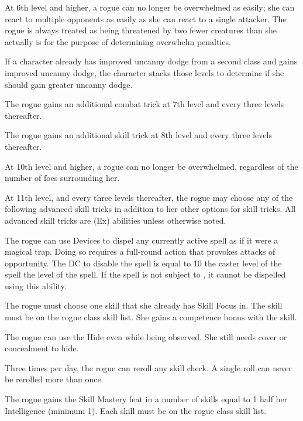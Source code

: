  At 6th level and higher, a rogue can no longer be overwhelmed as easily; she can react to multiple opponents as easily as she can react to a single attacker. The rogue is always treated as being threatened by two fewer creatures than she actually is for the purpose of determining overwhelm penalties. 

\par If a character already has improved uncanny dodge from a second class and gains improved uncanny dodge, the character stacks those levels to determine if she should gain greater uncanny dodge.

 The rogue gains an additional combat trick at 7th level and every three levels thereafter.

 The rogue gains an additional skill trick at 8th level and every three levels thereafter.

 At 10th level and higher, a rogue can no longer be overwhelmed, regardless of the number of foes surrounding her.

 At 11th level, and every three levels thereafter, the rogue may choose any of the following advanced skill tricks in addition to her other options for skill tricks. All advanced skill tricks are (Ex) abilities unless otherwise noted.

 The rogue can use Devices to dispel any currently active spell as if it were a magical trap. Doing so requires a full-round action that provokes attacks of opportunity. The DC to disable the spell is equal to 10 \add the caster level of the spell \add the level of the spell. If the spell is not subject to , it cannot be dispelled using this ability.

 The rogue must choose one skill that she already has Skill Focus in. The skill must be on the rogue class skill list. She gains a  competence bonus with the skill.

 The rogue can use the Hide even while being observed. She still needs cover or concealment to hide.

 Three times per day, the rogue can reroll any skill check. A single roll can never be rerolled more than once.

 The rogue gains the Skill Mastery feat in a number of skills equal to 1 \add half her Intelligence (minimum 1). Each skill must be on the rogue class skill list.

